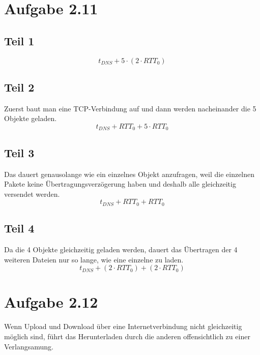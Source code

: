 \documentclass[10pt,a4paper]{article}
\begin{document}
\section{Aufgabe 2.11}

\subsection{Teil 1}

\begin{equation}
  t_{DNS} + 5 \cdot (2 \cdot RTT_{0})
\end{equation}

\subsection{Teil 2}

Zuerst baut man eine TCP-Verbindung auf und dann werden nacheinander die 5
Objekte geladen.
\begin{equation}
  t_{DNS} + RTT_{0} + 5 \cdot RTT_{0}
\end{equation}

\subsection{Teil 3}

Das dauert genausolange wie ein einzelnes Objekt anzufragen, weil die einzelnen
Pakete keine Übertragungsverzögerung haben und deshalb alle gleichzeitig
versendet werden.
\begin{equation}
  t_{DNS} + RTT_{0} + RTT_{0}
\end{equation}

\subsection{Teil 4}

Da die 4 Objekte gleichzeitig geladen werden, dauert das Übertragen der 4
weiteren Dateien nur so lange, wie eine einzelne zu laden.
\begin{equation}
  t_{DNS} + (2 \cdot RTT_{0}) + (2 \cdot RTT_{0})
\end{equation}

\section{Aufgabe 2.12}

Wenn Upload und Download über eine Internetverbindung nicht gleichzeitig möglich
sind, führt das Herunterladen durch die anderen offensichtlich zu einer
Verlangsamung.
\end{document}
